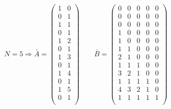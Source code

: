 \documentclass{article}
\begin{document}
\thispagestyle{empty}

$$
N=5 \Rightarrow
\bar{A}=
\begin{pmatrix}
1&  0\\
0&  1\\
1&  1\\
0&  1\\
1&  2\\
0&  1\\
1&  3\\
0&  1\\
1&  4\\
0&  1\\
1&  5\\
0&  1\\
\end{pmatrix}
\qquad
\bar{B}=
\begin{pmatrix}
 0&  0&  0&  0&  0\\
 0&  0&  0&  0&  0\\
 0&  0&  0&  0&  0\\
 1&  0&  0&  0&  0\\
 1&  0&  0&  0&  0\\
 1&  1&  0&  0&  0\\
 2&  1&  0&  0&  0\\
 1&  1&  1&  0&  0\\
 3&  2&  1&  0&  0\\
 1&  1&  1&  1&  0\\
 4&  3&  2&  1&  0\\
 1&  1&  1&  1&  1\\
\end{pmatrix}
$$
\end{document}
